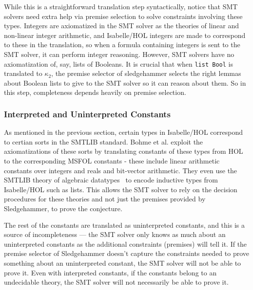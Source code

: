 \documentclass[11pt]{article}
\begin{document}
	While this is a straightforward
	translation step syntactically, 
	notice that SMT solvers need 
	extra help via premise selection 
	to solve constraints involving 
	these types. Integers are 
	axiomatized in the SMT solver as 
	the theories of linear and 
	non-linear integer arithmetic, and 
	Isabelle/HOL integers are made to 
	correspond to these in the translation, 
	so when a formula containing 
	integers is sent to the SMT solver, 
	it can perform integer reasoning. 
	However, SMT solvers have no 
	axiomatization of, say, lists 
	of Booleans. It is crucial that when 
	\texttt{list Bool} is 
	translated to $\kappa_2$, the 
	premise selector of sledgehammer
	selects the right lemmas about 
	Boolean lists to give to the 
	SMT solver so it can reason 
	about them. So in this step, 
	completeness depends heavily on 
	premise selection.
	
	\subsubsection{Interpreted and Uninterpreted Constants}
	As mentioned in the previous section,
	certain types in Isabelle/HOL correspond
	to certian sorts in the SMTLIB standard.
	Bohme et al. exploit the axiomatizations 
	of these sorts by translating constants 
	of these types from HOL to the 
	corresponding MSFOL constants - these 
	include linear arithmetic constants over 
	integers and reals and bit-vector 
	arithmetic. They even use the SMTLIB 
	theory of algebraic 
	datatypes~\cite{BarST-PDPAR-06} to 
	encode inductive types from Isabelle/HOL
	such as lists. This allows the SMT solver
	to rely on the decision procedures for 
	these theories and not just the premises
	provided by Sledgehammer, to prove the 
	conjecture. 
	
	The rest of the constants are 
	translated as uninterpreted constants, 
	and this is a source of 
	incompleteness --- the SMT solver only 
	knows as much about an uninterpreted 
	constants as the additional constraints 
	(premises) will tell it. If the premise 
	selector of Sledgehammer doesn't capture 
	the constraints needed to prove something
	about an uninterpreted constant, the SMT 
	solver will not be able to prove it.
	Even with interpreted constants, if the 
	constants belong to an undecidable theory,
	the SMT solver will not necessarily be 
	able to prove it.
	
\end{document}
